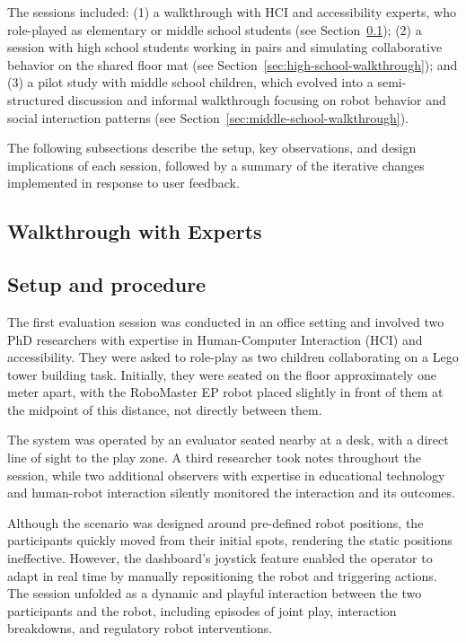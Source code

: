 \documentclass[a4paper]{usiinfbachelorproject}
\begin{document}
The sessions included:
(1) a walkthrough with HCI and accessibility experts, who role-played as elementary or middle school students (see Section~\ref{sec:expert-walkthrough});
(2) a session with high school students working in pairs and simulating collaborative behavior on the shared floor mat (see Section~\ref{sec:high-school-walkthrough}); and
(3) a pilot study with middle school children, which evolved into a semi-structured discussion and informal walkthrough focusing on robot behavior and social interaction patterns (see Section~\ref{sec:middle-school-walkthrough}).

The following subsections describe the setup, key observations, and design implications of each session, followed by a summary of the iterative changes implemented in response to user feedback.


\subsection{\textbf{Walkthrough with Experts}}\label{sec:expert-walkthrough}
\subsection*{\textbf{Setup and procedure}}
The first evaluation session was conducted in an office setting and involved two PhD researchers with expertise in Human-Computer Interaction (HCI) and accessibility.
They were asked to role-play as two children collaborating on a Lego tower building task.
Initially, they were seated on the floor approximately one meter apart, with the RoboMaster EP robot placed slightly in front of them at the midpoint of this distance, not directly between them.

The system was operated by an evaluator seated nearby at a desk, with a direct line of sight to the play zone.
A third researcher took notes throughout the session, while two additional observers with expertise in educational technology and human-robot interaction silently monitored the interaction and its outcomes.

Although the scenario was designed around pre-defined robot positions, the participants quickly moved from their initial spots, rendering the static positions ineffective.
However, the dashboard's joystick feature enabled the operator to adapt in real time by manually repositioning the robot and triggering actions.
The session unfolded as a dynamic and playful interaction between the two participants and the robot, including episodes of joint play, interaction breakdowns, and regulatory robot interventions.
\end{document}
